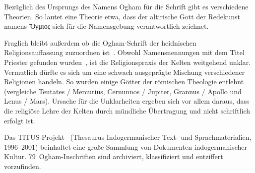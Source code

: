 \documentclass[a4paper]{scrartcl}
\begin{document}
Bezüglich des Ursprungs des Namens Ogham für die Schrift gibt es verschiedene Theorien. So lautet eine Theorie etwa, dass der altirische Gott der Redekunst namens \foreignlanguage{greek}{\ipafont Ὄγμιος} sich für die Namensgebung verantwortlich zeichnet. 

Fraglich bleibt außerdem ob die Ogham-Schrift der heidnischen Religionsauffassung zuzuordnen ist~\cite{ogham-heidnisch1,ogham-heidnisch2}. Obwohl Namensnennungen mit dem Titel Priester gefunden wurden~\cite[S. 36]{düwel}, ist die Religionspraxis der Kelten weitgehend unklar. Vermutlich dürfte es sich um eine schwach ausgeprägte Mischung verschiedener Religionen handeln. So wurden einige Götter der römischen Theologie entlehnt~\cite{ogham-religion} (vergleiche Teutates / Mercurius, Cernunnos / Jupiter, Grannus / Apollo und Lenus / Mars). Ursache für die Unklarheiten ergeben sich vor allem daraus, dass die religiöse Lehre der Kelten durch mündliche Übertragung und nicht schriftlich erfolgt ist.

Das TITUS-Projekt~\cite{ogham-titus} (\glqq Thesaurus Indogermanischer Text- und Sprachmaterialien\grqq, 1996--2001) beinhaltet eine große Sammlung von Dokumenten indogermanischer Kultur. 79~Ogham-Inschriften sind archiviert, klassifiziert und entziffert vorzufinden.
\end{document}
